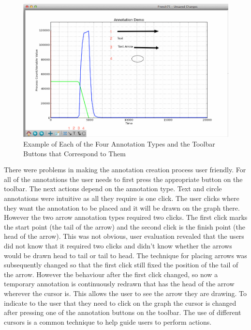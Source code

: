 \begin{figure}[h!]
    \centering
    \includegraphics[width=\textwidth]{images/annotation_demo.png}
    \caption{Example of Each of the Four Annotation Types and the Toolbar Buttons that Correspond to Them}
    \label{fig:annotation_demo}
\end{figure}

There were problems in making the annotation creation process user friendly.  For all of the annotations the user needs to first press the appropriate button on the toolbar.  The next actions depend on the annotation type.  Text and circle annotations were intuitive as all they require is one click.  The user clicks where they want the annotation to be placed and it will be drawn on the graph there.  However the two arrow annotation types required two clicks.  The first click marks the start point (the tail of the arrow) and the second click is the finish point (the head of the arrow).  This was not obvious, user evaluation revealed that the users did not know that it required two clicks and didn't know whether the arrows would be drawn head to tail or tail to head.  The technique for placing arrows was subsequently changed so that the first click still fixed the position of the tail of the arrow. However the behaviour after the first click changed, so now a temporary annotation is continuously redrawn that has the head of the arrow wherever the cursor is.  This allows the user to see the arrow they are drawing.  To indicate to the user that they need to click on the graph the cursor is changed after pressing one of the annotation buttons on the toolbar.  The use of different cursors is a common technique to help guide users to perform actions.


